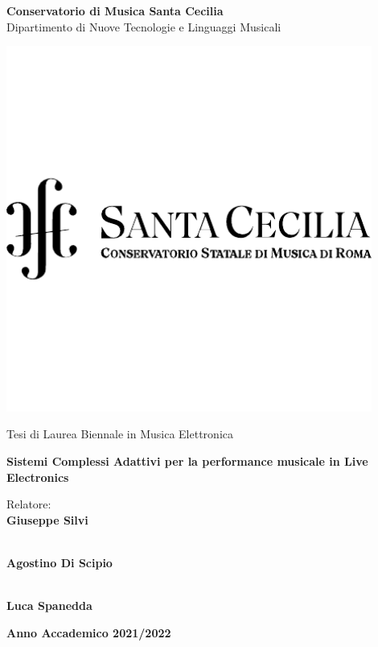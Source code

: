 \begin{center}
{\LARGE \textbf{Conservatorio di Musica Santa Cecilia}} \\
\vspace{0.2cm}
{\Large {Dipartimento di Nuove Tecnologie e Linguaggi
Musicali}} \\ 
\vspace{1cm}

\includegraphics[width=12cm]{figures/logo-CSC-pdf-cropped.pdf} \\
\vspace{0.8cm}

{\Large {Tesi di Laurea Biennale in Musica Elettronica}} \\
\vspace{1cm}

{\LARGE \textbf{Sistemi Complessi Adattivi per la performance musicale in Live Electronics}} \\ 
\vspace{1cm}

\end{center}

\begin{multicols}{2}
\noindent \large{Relatore:} \\
\large{\textbf{Giuseppe Silvi}} \\
\vspace{0.1cm}

 \\
\large{\textbf{Agostino Di Scipio}} \\
\vspace{0.1cm}

\columnbreak

 \\
\large{\textbf{Luca Spanedda}} \\
\end{multicols}
\vspace{2cm}

\begin{center}
    \large{\textbf{Anno Accademico 2021/2022}}
\end{center}